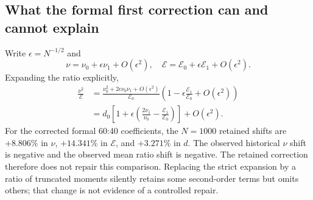\subsection{What the formal first correction can and cannot explain}
Write $\epsilon=N^{-1/2}$ and
\begin{equation}
 \nu=\nu_0+\epsilon\nu_1+O(\epsilon^2),\quad
 \mathcal E=\mathcal E_0+\epsilon\mathcal E_1+O(\epsilon^2).
\end{equation}
Expanding the ratio explicitly,
\begin{align}
 \frac{\nu^2}{\mathcal E}
 &=\frac{\nu_0^2+2\epsilon\nu_0\nu_1+O(\epsilon^2)}
         {\mathcal E_0}
       \left(1-\epsilon\frac{\mathcal E_1}{\mathcal E_0}
             +O(\epsilon^2)\right)\\
 &=d_0\left[1+\epsilon\left(
       \frac{2\nu_1}{\nu_0}-\frac{\mathcal E_1}{\mathcal E_0}
                               \right)\right]+O(\epsilon^2).
\end{align}
For the corrected formal 60:40 coefficients, the $N=1000$ retained shifts
are $+8.806\%$ in $\nu$, $+14.341\%$ in $\mathcal E$, and $+3.271\%$
in $d$. The observed historical $\nu$ shift is negative and the observed
mean ratio shift is negative. The retained correction therefore does not
repair this comparison. Replacing the strict expansion by a ratio of
truncated moments silently retains some second-order terms but omits others;
that change is not evidence of a controlled repair.

